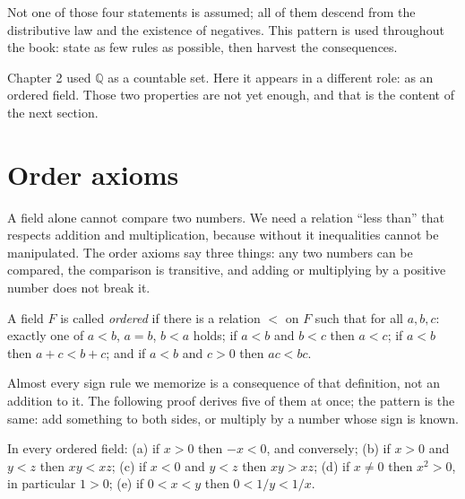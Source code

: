 Not one of those four statements is assumed; all of them descend from the distributive
law and the existence of negatives. This pattern is used throughout the book: state as
few rules as possible, then harvest the consequences.


Chapter 2 used $\mathbb{Q}$ as a countable set. Here it appears in a different role:
as an ordered field. Those two properties are not yet enough, and that is the content
of the next section.

\section{Order axioms}

A field alone cannot compare two numbers. We need a relation ``less than'' that
respects addition and multiplication, because without it inequalities cannot be
manipulated. The order axioms say three things: any two numbers can be compared, the
comparison is transitive, and adding or multiplying by a positive number does not
break it.

\begin{definisi}
A field $F$ is called \emph{ordered} if there is a relation $<$ on $F$ such that for
all $a,b,c$: exactly one of $a<b$, $a=b$, $b<a$ holds; if $a<b$ and $b<c$ then
$a<c$; if $a<b$ then $a+c<b+c$; and if $a<b$ and $c>0$ then $ac<bc$.
\end{definisi}

Almost every sign rule we memorize is a consequence of that definition, not an
addition to it. The following proof derives five of them at once; the pattern is the
same: add something to both sides, or multiply by a number whose sign is known.

\begin{proposisi}
In every ordered field: (a) if $x>0$ then $-x<0$, and conversely;
(b) if $x>0$ and $y<z$ then $xy<xz$; (c) if $x<0$ and $y<z$ then $xy>xz$;
(d) if $x\neq 0$ then $x^2>0$, in particular $1>0$; (e) if $0<x<y$ then
$0<1/y<1/x$.
\end{proposisi}


